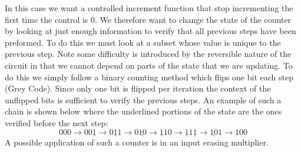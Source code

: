   In this case we want a controlled increment function that stop incrementing the first time the control is $0$.
  We therefore want to change the state of the counter by looking at just enough information to verify that all previous steps have been preformed.
  To do this we must look at a subset whose value is unique to the previous step.
  Note some difficulty is introduced by the reversible nature of the circuit in that we cannot depend on parts of the state that we are updating.
  To do this we simply follow a binary counting method which flips one bit each step (Grey Code).
  Since only one bit is flipped per iteration the context of the unflipped bits is sufficient to verify the previous steps.
  An example of such a chain is shown below where the underlined portions of the state are the ones verified before the next step:
  \[
    000 \to 00\underline{1} \to 0\underline{1}1 \to 0\underline{10} \to \underline{1}10 \to
    \underline{1}1\underline{1} \to \underline{10}1 \to 100
  \]
  A possible application of such a counter is in an input erasing multiplier.
